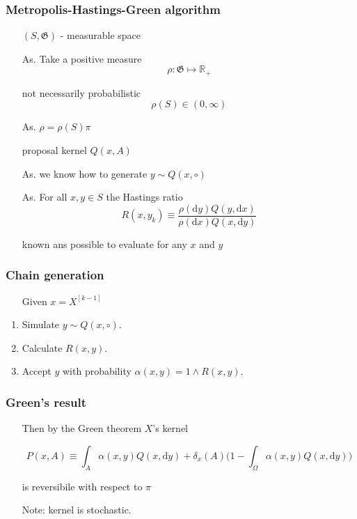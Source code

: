 
\begin{frame}
		\frametitle{ Metropolis-Hastings-Green algorithm}
	\begin{itemize}
		\item[] $ (S, \mathfrak{G}) $ - measurable space
		\item[\textcolor{gummi_red}{As.}] Take a positive measure
			 $$\rho: \mathfrak{G} \mapsto \mathbb{R}_{+}$$ 
		\item[] not necessarily probabilistic 
			$$\rho(S) \in (0, \infty)$$
		\item[\textcolor{gummi_red}{As.}] $ \rho = \rho(S) \pi $ 	 
		\item[] proposal kernel $Q(x,A)$ 
		\item[\textcolor{gummi_red}{As.}] we know how to generate $y \sim Q(x,\circ)$
		
		\item[\textcolor{gummi_red}{As.}] For all $x,y \in S$ the Hastings ratio
		$$R (x,y_k) \equiv \frac{\rho(\mathrm{d } y)Q (y, \mathrm{d }x)}{\rho(\mathrm{d } x)Q (x, \mathrm{d }y)}$$ 
		\item[] known ans possible to evaluate for any $x$ and $y$ 
	\end{itemize}
	
\end{frame}

\begin{frame}
		\frametitle{Chain generation}
	\begin{itemize}
		\item[] Given $x = X^{[k-1]}$
	\end{itemize}

	\begin{enumerate}
		\item Simulate $y \sim Q (x, \circ)$.
		\item Calculate $R (x,y)$.
		\item Accept $y$ with probability $\alpha(x,y) = 1\wedge R (x,y)$.
	\end{enumerate}
\end{frame}


\begin{frame}
	\frametitle{ Green's result}
	\begin{itemize}
		\item[] Then by the Green theorem $X$'s kernel 
		\item[]	$$P(x,A) \equiv \int_A \alpha (x,y) Q(x, \mathrm{d }y) + \delta_x (A) \Big(1 - \int_{\Omega} \alpha(x,y) Q(x,\mathrm{d }y) \Big) $$
	
		\item[] is reversibile with respect to $\pi$

		\item[] Note: kernel is stochastic. 
	\end{itemize}
\end{frame}
